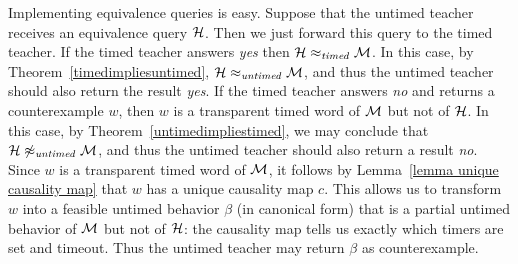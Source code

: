 Implementing equivalence queries is easy.
Suppose that the untimed teacher receives an equivalence query ${\mathcal H}$.
Then we just forward this query to the timed teacher.
If the timed teacher answers \emph{yes} then ${\mathcal H} \approx_{\mathit{timed}} {\mathcal M}$.
In this case, by Theorem~\ref{timedimpliesuntimed}, ${\mathcal H} \approx_{\mathit{untimed}} {\mathcal M}$,
and thus the untimed teacher should also return the result \emph{yes}.
If the timed teacher answers \emph{no} and returns a counterexample $w$,
then $w$ is a transparent timed word of ${\mathcal M}$ but not of ${\mathcal H}$.
In this case, by Theorem~\ref{untimedimpliestimed}, we may conclude that
${\mathcal H} \not\approx_{\mathit{untimed}} {\mathcal M}$, and thus the untimed teacher should also return a result \emph{no}.
Since $w$ is a transparent timed word of ${\mathcal M}$, it 
\iflong
follows by Lemma~\ref{lemma unique causality map} that $w$ 
\fi
has a unique causality map $c$.
This allows us to transform $w$ into a feasible untimed behavior $\beta$ (in canonical form) that is a partial untimed
behavior of ${\mathcal M}$ but not of ${\mathcal H}$: the causality map tells us exactly which timers are set and timeout. 
Thus the untimed teacher may return $\beta$ as counterexample.






